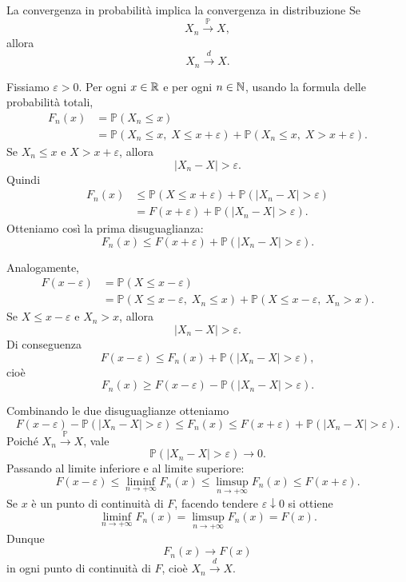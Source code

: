 \documentclass[a4paper]{article}
\begin{document}
\begin{snippettheorem}{La convergenza in probabilità implica la convergenza in distribuzione}
    Se
    \[
        X_n \xrightarrow{\mathbb{P}} X,
    \]
    allora
    \[
        X_n \xrightarrow{d} X.
    \]
\end{snippettheorem}

\begin{snippetproof}{}
    Fissiamo \(\varepsilon>0\). Per ogni \(x\in\mathbb{R}\) e per ogni \(n\in\mathbb{N}\), usando la formula delle probabilità totali,
    \begin{align*}
        F_n(x)
        &=\mathbb{P}(X_n\leq x)\\
        &=\mathbb{P}(X_n\leq x,\;X\leq x+\varepsilon)
        +\mathbb{P}(X_n\leq x,\;X>x+\varepsilon).
    \end{align*}
    Se \(X_n\leq x\) e \(X>x+\varepsilon\), allora
    \[
        |X_n-X|>\varepsilon.
    \]
    Quindi
    \begin{align*}
        F_n(x)
        &\leq \mathbb{P}(X\leq x+\varepsilon)
        +\mathbb{P}(|X_n-X|>\varepsilon)\\
        &=F(x+\varepsilon)+\mathbb{P}(|X_n-X|>\varepsilon).
    \end{align*}
    Otteniamo così la prima disuguaglianza:
    \[
        F_n(x)
        \leq
        F(x+\varepsilon)+\mathbb{P}(|X_n-X|>\varepsilon).
    \]

    Analogamente,
    \begin{align*}
        F(x-\varepsilon)
        &=\mathbb{P}(X\leq x-\varepsilon)\\
        &=\mathbb{P}(X\leq x-\varepsilon,\;X_n\leq x)
        +\mathbb{P}(X\leq x-\varepsilon,\;X_n>x).
    \end{align*}
    Se \(X\leq x-\varepsilon\) e \(X_n>x\), allora
    \[
        |X_n-X|>\varepsilon.
    \]
    Di conseguenza
    \[
        F(x-\varepsilon)
        \leq F_n(x)+\mathbb{P}(|X_n-X|>\varepsilon),
    \]
    cioè
    \[
        F_n(x)
        \geq
        F(x-\varepsilon)-\mathbb{P}(|X_n-X|>\varepsilon).
    \]

    Combinando le due disuguaglianze otteniamo
    \[
        F(x-\varepsilon)-\mathbb{P}(|X_n-X|>\varepsilon)
        \leq
        F_n(x)
        \leq
        F(x+\varepsilon)+\mathbb{P}(|X_n-X|>\varepsilon).
    \]
    Poiché \(X_n\xrightarrow{\mathbb{P}}X\), vale
    \[
        \mathbb{P}(|X_n-X|>\varepsilon)\longrightarrow 0.
    \]
    Passando al limite inferiore e al limite superiore:
    \[
        F(x-\varepsilon)
        \leq
        \liminf_{n\to+\infty}F_n(x)
        \leq
        \limsup_{n\to+\infty}F_n(x)
        \leq
        F(x+\varepsilon).
    \]
    Se \(x\) è un punto di continuità di \(F\), facendo tendere \(\varepsilon\downarrow 0\) si ottiene
    \[
        \liminf_{n\to+\infty}F_n(x)
        =
        \limsup_{n\to+\infty}F_n(x)
        =
        F(x).
    \]
    Dunque
    \[
        F_n(x)\longrightarrow F(x)
    \]
    in ogni punto di continuità di \(F\), cioè \(X_n\xrightarrow{d}X\).
\end{snippetproof}
\end{document}
